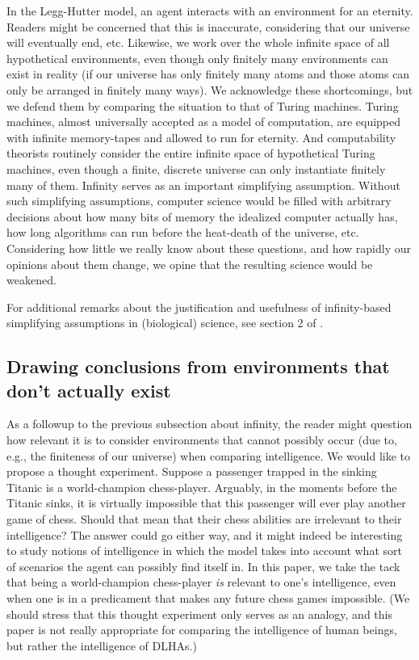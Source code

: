 \documentclass[twoside,11pt]{article}
\begin{document}
In the Legg-Hutter model, an agent interacts with an environment for an eternity.
Readers might be concerned that this is inaccurate, considering that our universe
will eventually end, etc. Likewise, we work over the whole infinite space of
all hypothetical environments, even though only finitely many environments can
exist in reality (if our universe has only finitely many atoms and those
atoms can only be arranged in finitely many ways). We acknowledge these shortcomings,
but we defend them by comparing the situation to that of Turing machines. Turing
machines, almost universally accepted as a model of computation, are
equipped with infinite memory-tapes and allowed to run for eternity. And
computability theorists routinely consider the entire infinite space of hypothetical
Turing machines, even though a finite, discrete universe can only
instantiate finitely many of them.
Infinity serves as an important simplifying assumption. Without such simplifying
assumptions, computer science would be filled with arbitrary decisions about
how many bits of memory the idealized computer actually has, how long
algorithms can run before the heat-death of the universe, etc. Considering
how little we really know about these questions, and how rapidly our opinions about
them change, we opine that the resulting science would be weakened.

For additional remarks about the justification and usefulness of infinity-based
simplifying assumptions in (biological) science, see section 2 of
\cite{alexander2013}.

\subsection{Drawing conclusions from environments that don't actually exist}

As a followup to the previous subsection about infinity, the reader might
question how relevant it is to consider environments that cannot possibly occur
(due to, e.g., the finiteness of our universe) when comparing intelligence.
We would like to propose a thought experiment. Suppose a passenger
trapped in the sinking Titanic is a world-champion chess-player. Arguably,
in the moments before the Titanic sinks, it is virtually impossible that this
passenger will ever play another game of chess. Should that mean
that their chess abilities are irrelevant to their intelligence? The answer could
go either way, and it might indeed be interesting to study notions of intelligence
in which the model takes into account what sort of scenarios the agent can
possibly find itself in. In this paper, we take the tack that being a world-champion
chess-player \emph{is} relevant to one's intelligence, even when one is in a
predicament that makes any future chess games impossible. (We should stress that
this thought experiment only serves as an analogy, and this paper is not really
appropriate for comparing the intelligence of human beings, but rather the
intelligence of DLHAs.)
\end{document}
